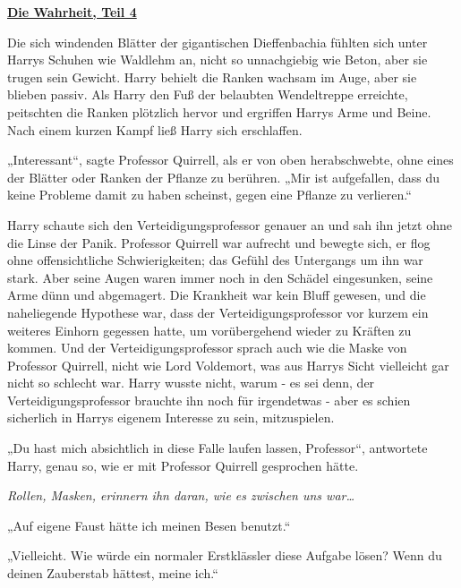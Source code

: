 

\hypertarget{die-wahrheit-teil-4}{%

\textbf{\uline{Die Wahrheit, Teil 4}}

Die sich windenden Blätter der gigantischen Dieffenbachia fühlten sich unter Harrys Schuhen wie Waldlehm an, nicht so unnachgiebig wie Beton, aber sie trugen sein Gewicht. Harry behielt die Ranken wachsam im Auge, aber sie blieben passiv. Als Harry den Fuß der belaubten Wendeltreppe erreichte, peitschten die Ranken plötzlich hervor und ergriffen Harrys Arme und Beine. Nach einem kurzen Kampf ließ Harry sich erschlaffen.

„Interessant“, sagte Professor Quirrell, als er von oben herabschwebte, ohne eines der Blätter oder Ranken der Pflanze zu berühren. „Mir ist aufgefallen, dass du keine Probleme damit zu haben scheinst, gegen eine Pflanze zu verlieren.“

Harry schaute sich den Verteidigungsprofessor genauer an und sah ihn jetzt ohne die Linse der Panik. Professor Quirrell war aufrecht und bewegte sich, er flog ohne offensichtliche Schwierigkeiten; das Gefühl des Untergangs um ihn war stark. Aber seine Augen waren immer noch in den Schädel eingesunken, seine Arme dünn und abgemagert. Die Krankheit war kein Bluff gewesen, und die naheliegende Hypothese war, dass der Verteidigungsprofessor vor kurzem ein weiteres Einhorn gegessen hatte, um vorübergehend wieder zu Kräften zu kommen. Und der Verteidigungsprofessor sprach auch wie die Maske von Professor Quirrell, nicht wie Lord Voldemort, was aus Harrys Sicht vielleicht gar nicht so schlecht war. Harry wusste nicht, warum - es sei denn, der Verteidigungsprofessor brauchte ihn noch für irgendetwas - aber es schien sicherlich in Harrys eigenem Interesse zu sein, mitzuspielen.

„Du hast mich absichtlich in diese Falle laufen lassen, Professor“, antwortete Harry, genau so, wie er mit Professor Quirrell gesprochen hätte.

\emph{Rollen, Masken, erinnern ihn daran, wie es zwischen uns war…}

„Auf eigene Faust hätte ich meinen Besen benutzt.“

„Vielleicht. Wie würde ein normaler Erstklässler diese Aufgabe lösen? Wenn du deinen Zauberstab hättest, meine ich.“

}
